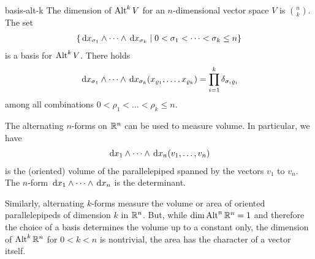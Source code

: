 \begin{Lemma}{basis-alt-k}
  The dimension of $\operatorname{Alt}^k V$ for an $n$-dimensional vector space $V$
  is $\binom nk$. The set
  \begin{gather}
    \left\{ \,\mathrm{d} x_{\sigma_1}\wedge\dots\wedge\,\mathrm{d} x_{\sigma_k} \;\middle|\;
      0<\sigma_1 < \dots < \sigma_k\le n \right\}
  \end{gather}
  is a basis for $\operatorname{Alt}^k V$.
  There holds
  \begin{gather}
    \,\mathrm{d} x_{\sigma_1}\wedge\dots\wedge\,\mathrm{d} x_{\sigma_k} (x_{\varrho_1},\dots,x_{\varrho_k})
    = \prod_{i=1}^k \delta_{\sigma_i\varrho_i}
  \end{gather}
  among all combinations $0<\rho_1 < \dots < \rho_k\le n$.
\end{Lemma}

\begin{remark}
  The alternating $n$-forms on $\mathbb R^n$ can be used to measure volume. In particular,
  we have
  \begin{gather}
    \,\mathrm{d} x_1\wedge\dots\wedge \,\mathrm{d} x_n(v_1,\dots,v_n)
  \end{gather}
  is the (oriented) volume of the parallelepiped spanned by the
  vectors $v_1$ to $v_n$. The $n$-form $\,\mathrm{d} x_1\wedge\dots\wedge \,\mathrm{d} x_n$ is
  the determinant.

  Similarly, alternating $k$-forms measure the volume or area of oriented
  parallelepipeds of dimension $k$ in $\mathbb R^n$. But, while
  $\dim\operatorname{Alt}^n\mathbb R^n = 1$ and therefore the choice of a basis determines
  the volume up to a constant only, the dimension of $\operatorname{Alt}^k\mathbb R^n$ for
  $0<k<n$ is nontrivial, the area has the character of a vector itself.
\end{remark}

